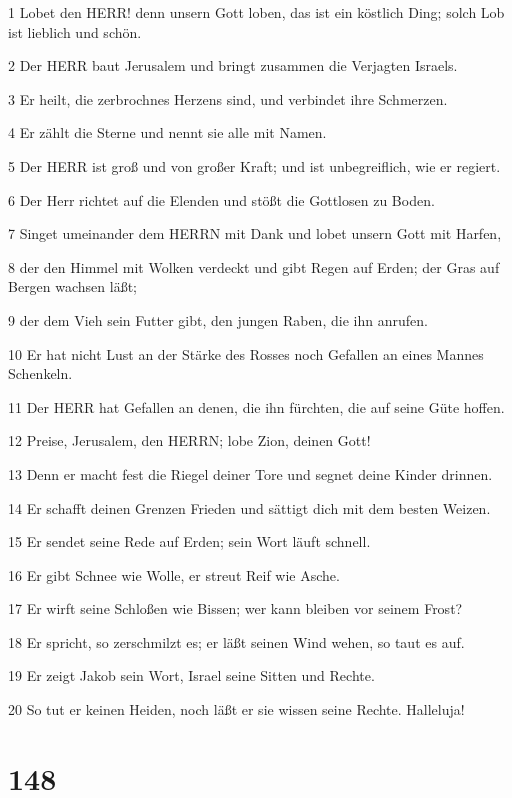 \par 1 Lobet den HERR! denn unsern Gott loben, das ist ein köstlich Ding; solch Lob ist lieblich und schön.
\par 2 Der HERR baut Jerusalem und bringt zusammen die Verjagten Israels.
\par 3 Er heilt, die zerbrochnes Herzens sind, und verbindet ihre Schmerzen.
\par 4 Er zählt die Sterne und nennt sie alle mit Namen.
\par 5 Der HERR ist groß und von großer Kraft; und ist unbegreiflich, wie er regiert.
\par 6 Der Herr richtet auf die Elenden und stößt die Gottlosen zu Boden.
\par 7 Singet umeinander dem HERRN mit Dank und lobet unsern Gott mit Harfen,
\par 8 der den Himmel mit Wolken verdeckt und gibt Regen auf Erden; der Gras auf Bergen wachsen läßt;
\par 9 der dem Vieh sein Futter gibt, den jungen Raben, die ihn anrufen.
\par 10 Er hat nicht Lust an der Stärke des Rosses noch Gefallen an eines Mannes Schenkeln.
\par 11 Der HERR hat Gefallen an denen, die ihn fürchten, die auf seine Güte hoffen.
\par 12 Preise, Jerusalem, den HERRN; lobe Zion, deinen Gott!
\par 13 Denn er macht fest die Riegel deiner Tore und segnet deine Kinder drinnen.
\par 14 Er schafft deinen Grenzen Frieden und sättigt dich mit dem besten Weizen.
\par 15 Er sendet seine Rede auf Erden; sein Wort läuft schnell.
\par 16 Er gibt Schnee wie Wolle, er streut Reif wie Asche.
\par 17 Er wirft seine Schloßen wie Bissen; wer kann bleiben vor seinem Frost?
\par 18 Er spricht, so zerschmilzt es; er läßt seinen Wind wehen, so taut es auf.
\par 19 Er zeigt Jakob sein Wort, Israel seine Sitten und Rechte.
\par 20 So tut er keinen Heiden, noch läßt er sie wissen seine Rechte. Halleluja!

\chapter{148}

